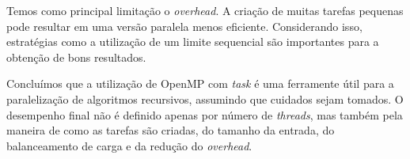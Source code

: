 \documentclass[
    12pt,
    oneside,
    a4paper,
    brazil
]{abntex2}
\begin{document}
Temos como principal limitação o \textit{overhead}. A criação de muitas tarefas pequenas pode resultar em uma versão paralela menos eficiente. Considerando isso, estratégias como a utilização de um limite sequencial são importantes para a obtenção de bons resultados.

Concluímos que a utilização de OpenMP com \textit{task} é uma ferramente útil para a paralelização de algoritmos recursivos, assumindo que cuidados sejam tomados. O desempenho final não é definido apenas por número de \textit{threads}, mas também pela maneira de como as tarefas são criadas, do tamanho da entrada, do balanceamento de carga e da redução do \textit{overhead}.
\end{document}
